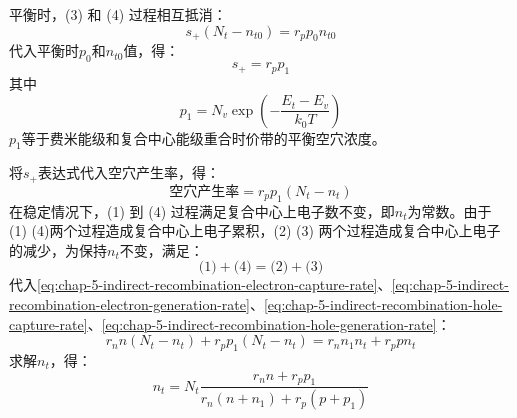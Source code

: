 平衡时，(3) 和 (4) 过程相互抵消：
\begin{equation}
    s_+(N_t-n_{t0})=r_pp_0n_{t0}
\end{equation}
代入平衡时$p_0$和$n_{t0}$值，得：
\begin{equation}
    s_+=r_pp_1
\end{equation}
其中
\begin{equation}
    p_1=N_v\exp{\left(-\frac{E_t-E_v}{k_0T}\right)}
\end{equation}
$p_1$等于费米能级和复合中心能级重合时价带的平衡空穴浓度。

将$s_+$表达式代入空穴产生率，得：
\begin{equation}
    \text{空穴产生率}=r_pp_1(N_t-n_t)\label{eq:chap-5-indirect-recombination-hole-generation-rate}
\end{equation}
在稳定情况下，(1) 到 (4) 过程满足复合中心上电子数不变，即$n_t$为常数。由于 (1)  (4)两个过程造成复合中心上电子累积，(2) (3) 两个过程造成复合中心上电子的减少，为保持$n_t$不变，满足：
\begin{equation}
    \text{(1)}+\text{(4)}=\text{(2)}+\text{(3)}
\end{equation}
代入\autoref{eq:chap-5-indirect-recombination-electron-capture-rate}、\autoref{eq:chap-5-indirect-recombination-electron-generation-rate}、\autoref{eq:chap-5-indirect-recombination-hole-capture-rate}、\autoref{eq:chap-5-indirect-recombination-hole-generation-rate}：
\begin{equation}
    r_nn(N_t-n_t)+r_pp_1(N_t-n_t)=r_nn_1n_t+r_ppn_t\label{eq:chap-5-indirect-recombination-center-electron-conecntration}
\end{equation}
求解$n_t$，得：
\begin{equation}
    n_t=N_t\frac{r_nn+r_pp_1}{r_n(n+n_1)+r_p(p+p_1)}
\end{equation}

